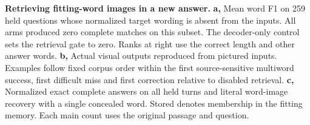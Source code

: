 \textbf{Retrieving fitting-word images in a new answer.} \textbf{a,} Mean word F1 on 259 held questions whose normalized target wording is absent from the inputs. All arms produced zero complete matches on this subset. The decoder-only control sets the retrieval gate to zero. Ranks at right use the correct length and other answer words. \textbf{b,} Actual visual outputs reproduced from pictured inputs. Examples follow fixed corpus order within the first source-sensitive multiword success, first difficult miss and first correction relative to disabled retrieval. \textbf{c,} Normalized exact complete answers on all held turns and literal word-image recovery with a single concealed word. Stored denotes membership in the fitting memory. Each main count uses the original passage and question.
